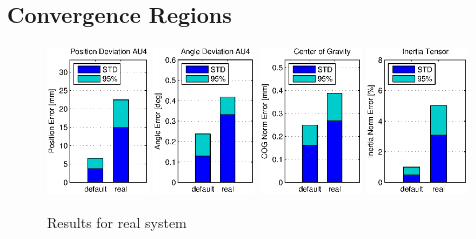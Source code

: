 \subsection{Convergence Regions}

\begin{figure}[hbtp]
\centering
\includegraphics[width=0.24\textwidth]{images/results/err_cmp_real_pos.eps}
\includegraphics[width=0.24\textwidth]{images/results/err_cmp_real_angle.eps} %
\includegraphics[width=0.24\textwidth]{images/results/err_cmp_real_cog.eps}
\includegraphics[width=0.24\textwidth]{images/results/err_cmp_real_tensor.eps}
\caption{Results for real system}
\label{fig:err_cmp_real}
\end{figure}

